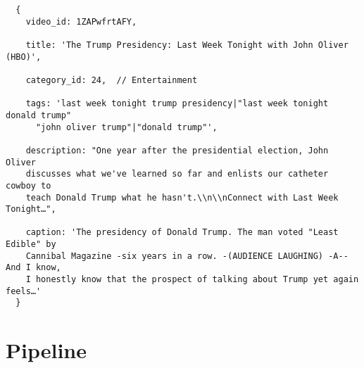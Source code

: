 \documentclass[letterpaper, 12pt]{article}
\begin{document}
\begin{Verbatim}
  {
    video_id: 1ZAPwfrtAFY,

    title: 'The Trump Presidency: Last Week Tonight with John Oliver (HBO)',

    category_id: 24,  // Entertainment

    tags: 'last week tonight trump presidency|"last week tonight donald trump"
      "john oliver trump"|"donald trump"',

    description: "One year after the presidential election, John Oliver
    discusses what we've learned so far and enlists our catheter cowboy to
    teach Donald Trump what he hasn't.\\n\\nConnect with Last Week Tonight…",

    caption: 'The presidency of Donald Trump. The man voted "Least Edible" by
    Cannibal Magazine -six years in a row. -(AUDIENCE LAUGHING) -A-- And I know,
    I honestly know that the prospect of talking about Trump yet again feels…'
  }
\end{Verbatim}

\section{Pipeline}
\end{document}
